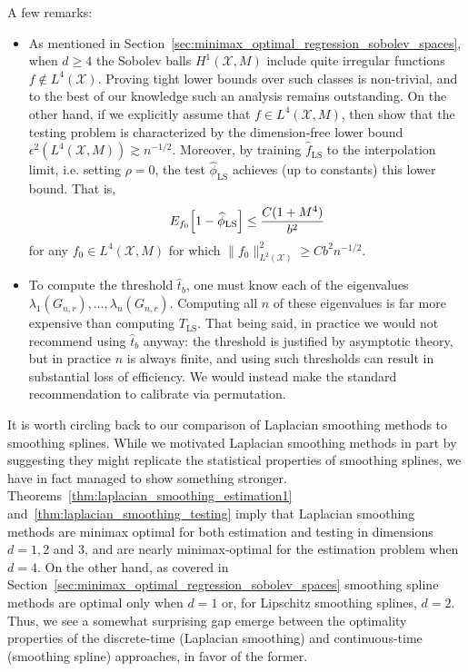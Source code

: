 \documentclass{article}
\newcommand{\1}{\mathbf{1}}
\newcommand{\Xset}{\mathcal{X}}
\newcommand{\Leb}{L}
\newcommand{\wh}[1]{\widehat{#1}}
\newcommand{\LS}{\mathrm{LS}}
\theoremstyle{alden}
\theoremstyle{aldenthm}
\theoremstyle{definition}
\theoremstyle{remark}
\begin{document}
A few remarks:
\begin{itemize}
	\item As mentioned in Section~\ref{sec:minimax_optimal_regression_sobolev_spaces}, when $d \geq 4$ the Sobolev balls $H^1(\Xset,M)$ include quite irregular functions $f \not\in \Leb^4(\Xset)$. Proving tight lower bounds over such classes is non-trivial, and to the best of our knowledge such an analysis remains outstanding. On the other hand, if we explicitly assume that $f \in \Leb^4(\Xset,M)$, then \cite{guerre02} show that the testing problem is characterized by the dimension-free lower bound $\epsilon^{2}(\Leb^4(\Xset,M)) \gtrsim n^{-1/2}$. Moreover, by training $\wh{f}_{\LS}$ to the interpolation limit, i.e. setting $\rho = 0$, the test $\wh{\phi}_{\LS}$ achieves (up to constants) this lower bound. That is, 
	\begin{equation}
	\label{eqn:laplacian_smoothing_testing_low_smoothness}
	E_{f_0}\Bigl[1 - \wh{\phi}_{\LS}\Bigr] \leq \frac{C(1 + M^4)}{b^2}
	\end{equation}
	for any $f_0 \in \Leb^4(\Xset,M)$ for which $\|f_0\|_{\Leb^2(\Xset)}^2 \geq C b^2n^{-1/2}$. 
	\item To compute the threshold $\wh{t}_b$, one must know each of the eigenvalues $\lambda_1(G_{n,r}),\ldots,\lambda_n(G_{n,r})$. Computing all $n$ of these eigenvalues is far more expensive than computing $T_{\LS}$. That being said, in practice we would not recommend using $\wh{t}_b$ anyway: the threshold is justified by asymptotic theory, but in practice $n$ is always finite, and using such thresholds can result in substantial loss of efficiency. We would instead make the standard recommendation to calibrate via permutation. 
\end{itemize}
It is worth circling back to our comparison of Laplacian smoothing methods to smoothing splines. While we motivated Laplacian smoothing methods in part by suggesting they might replicate the statistical properties of smoothing splines, we have in fact managed to show something stronger. Theorems~\ref{thm:laplacian_smoothing_estimation1} and~\ref{thm:laplacian_smoothing_testing} imply that Laplacian smoothing methods are minimax optimal for both estimation and testing in dimensions $d = 1,2$ and $3$, and are nearly minimax-optimal for the estimation problem when $d = 4$. On the other hand, as covered in Section~\ref{sec:minimax_optimal_regression_sobolev_spaces} smoothing spline methods are optimal only when $d = 1$ or, for Lipschitz smoothing splines, $d = 2$. Thus, we see a somewhat surprising gap emerge between the optimality properties of the discrete-time (Laplacian smoothing) and continuous-time (smoothing spline) approaches, in favor of the former.
\end{document}
